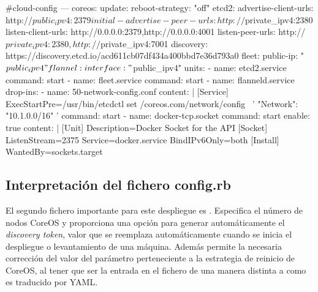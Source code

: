 \begin{codelisting}
\label{code:cloud-config1}
\begin{code}
#cloud-config
---
coreos:
  update:
    reboot-strategy: "off"
  etcd2:
    advertise-client-urls: http://$public_ipv4:2379
    initial-advertise-peer-urls: http://$private_ipv4:2380
    listen-client-urls: http://0.0.0.0:2379,http://0.0.0.0:4001
    listen-peer-urls: http://$private_ipv4:2380,http://$private_ipv4:7001
    discovery: https://discovery.etcd.io/acd611cb07df434a400bbd7e36d793a0
  fleet:
    public-ip: "$public_ipv4"
  flannel:
    interface: "$public_ipv4"
  units:
  - name: etcd2.service
    command: start
  - name: fleet.service
    command: start
  - name: flanneld.service
    drop-ins:
    - name: 50-network-config.conf
      content: |
        [Service]
        ExecStartPre=/usr/bin/etcdctl set /coreos.com/network/config \
        '{ "Network": "10.1.0.0/16" }'
    command: start
  - name: docker-tcp.socket
    command: start
    enable: true
    content: |
      [Unit]
      Description=Docker Socket for the API
      [Socket]
      ListenStream=2375
      Service=docker.service
      BindIPv6Only=both
      [Install]
      WantedBy=sockets.target
\end{code}
\end{codelisting}

\subsection{Interpretación del fichero config.rb}

El segundo fichero importante para este despliegue es . Especifica el número de nodos CoreOS y proporciona una opción para generar automáticamente el \textit{discovery token}, valor que se reemplaza automáticamente cuando se inicia el despliegue o levantamiento de una máquina. Además permite la necesaria corrección del valor del parámetro perteneciente a la estrategia de reinicio de CoreOS, al tener que ser la entrada en el fichero  de una manera distinta a como es traducido por YAML.

